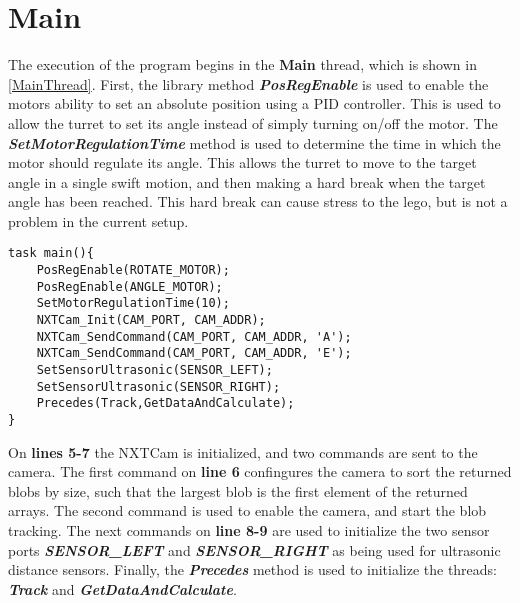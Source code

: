 \section{Main}
The execution of the program begins in the \textbf{Main} thread, which is shown
in \autoref{MainThread}. First, the library method
\textbf{\textit{PosRegEnable}} is used to enable the motors ability to set an absolute position using a PID controller. This is used to
allow the turret to set its angle instead of simply turning on/off the motor.
The \textbf{\textit{SetMotorRegulationTime}} method is used to determine the
time in which the motor should regulate its angle. This allows the turret to
move to the target angle in a single swift motion, and then making a hard break
when the target angle has been reached. This hard break can cause stress to the
lego, but is not a problem in the current setup.\nl

\begin{minipage}[H]{\linewidth}
\begin{lstlisting}[caption = Entry point for the program execution., label = MainThread] 
task main(){
    PosRegEnable(ROTATE_MOTOR);
    PosRegEnable(ANGLE_MOTOR);
    SetMotorRegulationTime(10);
    NXTCam_Init(CAM_PORT, CAM_ADDR);
    NXTCam_SendCommand(CAM_PORT, CAM_ADDR, 'A');
    NXTCam_SendCommand(CAM_PORT, CAM_ADDR, 'E');
    SetSensorUltrasonic(SENSOR_LEFT);
    SetSensorUltrasonic(SENSOR_RIGHT);
    Precedes(Track,GetDataAndCalculate);
}
\end{lstlisting}
\end{minipage}

On \textbf{lines 5-7} the NXTCam is initialized, and two commands are
sent to the camera. The first command on \textbf{line 6} confingures the camera
to sort the returned blobs by size, such that the largest blob is the first
element of the returned arrays. The second command is used to enable the camera,
and start the blob tracking. The next commands on \textbf{line 8-9} are used to
initialize the two sensor ports \textbf{\textit{SENSOR\_LEFT}} and
\textbf{\textit{SENSOR\_RIGHT}} as being used for ultrasonic distance sensors.
Finally, the \textbf{\textit{Precedes}} method is used to initialize the
threads: \textbf{\textit{Track}} and \textbf{\textit{GetDataAndCalculate}}.
